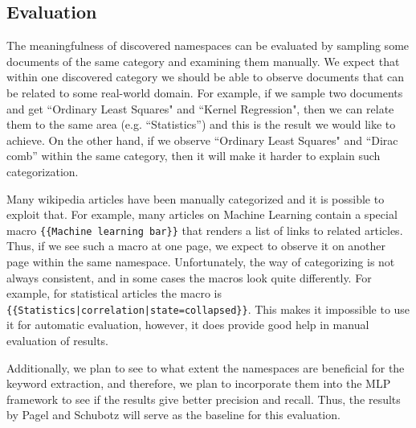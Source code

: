 \documentclass[12pt,a4paper]{article}
\begin{document}


\subsection{Evaluation}


The meaningfulness of discovered namespaces can be evaluated by sampling some documents of the same category and examining them manually. We expect that within one discovered category we should be able to observe documents that can be related to some real-world domain. For example, if we sample two documents and get ``Ordinary Least Squares" and ``Kernel Regression", then we can relate them to the same area (e.g. ``Statistics'') and this is the result we would like to achieve. On the other hand, if we observe ``Ordinary Least Squares" and ``Dirac comb'' within the same category, then it will make it harder to explain such categorization.

Many wikipedia articles have been manually categorized and it is possible to exploit that. For example, many articles on Machine Learning contain a special macro \texttt{\{\{Machine learning bar\}\}} that renders a list of links to related articles. Thus, if we see such a macro at one page, we expect to observe it on another page within the same namespace. Unfortunately, the way of categorizing is not always consistent, and in some cases the macros look quite differently. For example, for statistical articles the macro is \texttt{\{\{Statistics|correlation|state=collapsed\}\}}. This makes it impossible to use it for automatic evaluation, however, it does provide good help in manual evaluation of results.


Additionally, we plan to see to what extent the namespaces are beneficial for the keyword extraction, and therefore, we plan to incorporate them into the MLP framework \cite{source:mlpp} to see if the results give better precision and recall. Thus, the results by Pagel and Schubotz \cite{source:mlpp} will serve as the baseline for this evaluation.
\end{document}
